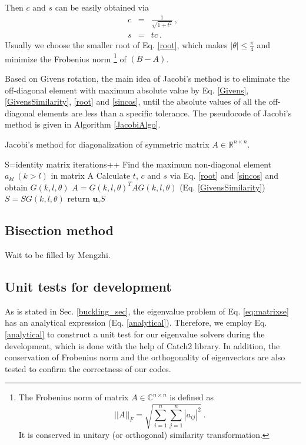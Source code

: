 \documentclass{article}
\begin{document}
Then $c$ and $s$ can be easily obtained via 
\begin{eqnarray}\label{sincos}
c&=&\frac{1}{\sqrt{1+t^2}}\ , \\ 
\nonumber
s&=&tc\ .
\end{eqnarray}
Usually we choose the smaller root of Eq. \ref{root}, which makes $|\theta|\leq\frac{\pi}{4}$ 
and minimize the Frobenius norm
\footnote{The Frobenius norm of matrix $A\in \mathbb{C}^{n \times n}$ is defined as 
\begin{equation*}
||A||_{F} = \sqrt{\sum_{i=1}^{n}\sum_{j=1}^{n}|a_{ij}|^2}\ . 
\end{equation*}
It is conserved in unitary (or orthogonal) similarity transformation. }
of $(B-A)$. 
\par
Based on Givens rotation, the main idea of Jacobi's method is to eliminate the off-diagonal element with maximum absolute value  
by Eq. \ref{Givens}, \ref{GivensSimilarity}, \ref{root} and \ref{sincos}, 
until the absolute values of all the off-diagonal elements are less than a specific tolerance. 
The pseudocode of Jacobi's method is given in Algorithm \ref{JacobiAlgo}. 
\begin{algorithm}[tb]
	\label{JacobiAlgo}
	\caption{Jacobi's method for diagonalization of symmetric matrix $A\in \mathbb{R}^{n\times n}$. }
    S=identity matrix\; 
    {
    	iterations++\;
    	Find the maximum non-diagonal element $a_{kl}\ (k>l)$ in matrix A\; 
    	Calculate $t$, $c$ and $s$ via Eq. \ref{root} and \ref{sincos} and obtain $G(k,l,\theta)$\; 
	    $A=G(k,l,\theta)^{T}AG(k,l,\theta)$ (Eq. \ref{GivensSimilarity})\; 
	    $S=SG(k,l,\theta)$\;
    }
	return $\mathbf{u}$,$S$\;
\end{algorithm}

	\subsection{Bisection method}
	Wait to be filled by Mengzhi. 
	\subsection{Unit tests for development}\label{unittests}
As is stated in Sec. \ref{buckling_sec}, the eigenvalue problem of Eq. \ref{eq:matrixse} 
has an analytical expression (Eq. \ref{analytical}). 
Therefore, we employ Eq. \ref{analytical} to construct a unit test for our eigenvalue solvers during the development, 
which is done with the help of Catch2 library. 
In addition, the conservation of Frobenius norm and the orthogonality of eigenvectors are also tested 
to confirm the correctness of our codes. 
	
\end{document}
